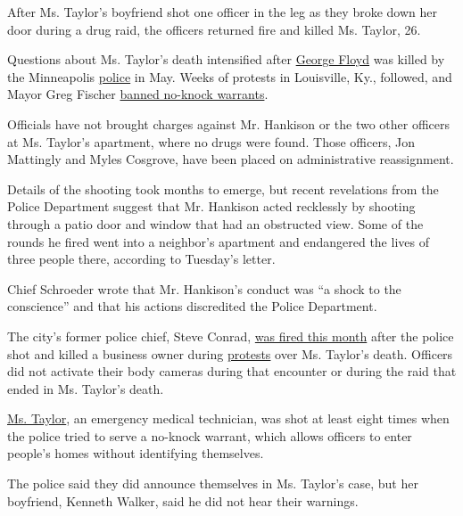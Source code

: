 After Ms. Taylor's boyfriend shot one officer in the leg as they broke
down her door during a drug raid, the officers returned fire and killed
Ms. Taylor, 26.

Questions about Ms. Taylor's death intensified after
\href{https://www.nytimes3xbfgragh.onion/article/george-floyd-who-is.html}{George
Floyd} was killed by the Minneapolis
\href{https://www.nytimes3xbfgragh.onion/2020/06/28/us/shooting-breonna-taylor-protest-louisville.html}{police}
in May. Weeks of protests in Louisville, Ky., followed, and Mayor Greg
Fischer
\href{https://www.nytimes3xbfgragh.onion/2020/06/12/us/breonna-taylor-law-passed.html}{banned
no-knock warrants}.

Officials have not brought charges against Mr. Hankison or the two other
officers at Ms. Taylor's apartment, where no drugs were found. Those
officers, Jon Mattingly and Myles Cosgrove, have been placed on
administrative reassignment.

Details of the shooting took months to emerge, but recent revelations
from the Police Department suggest that Mr. Hankison acted recklessly by
shooting through a patio door and window that had an obstructed view.
Some of the rounds he fired went into a neighbor's apartment and
endangered the lives of three people there, according to Tuesday's
letter.

Chief Schroeder wrote that Mr. Hankison's conduct was ``a shock to the
conscience'' and that his actions discredited the Police Department.

The city's former police chief, Steve Conrad,
\href{https://www.cbsnews.com/news/steve-conrad-louisville-police-chief-fired-protest-shooting-death/}{was
fired this month} after the police shot and killed a business owner
during
\href{https://www.nytimes3xbfgragh.onion/2020/06/28/us/shooting-breonna-taylor-protest-louisville.html}{protests}
over Ms. Taylor's death. Officers did not activate their body cameras
during that encounter or during the raid that ended in Ms. Taylor's
death.

\href{https://www.nytimes3xbfgragh.onion/article/breonna-taylor-police.html}{Ms.
Taylor}, an emergency medical technician, was shot at least eight times
when the police tried to serve a no-knock warrant, which allows officers
to enter people's homes without identifying themselves.

The police said they did announce themselves in Ms. Taylor's case, but
her boyfriend, Kenneth Walker, said he did not hear their warnings.

